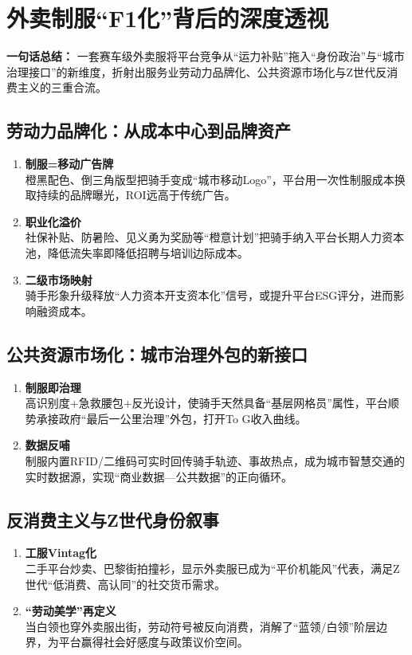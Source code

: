 \section{外卖制服“F1化”背后的深度透视}
\textbf{一句话总结：}  
一套赛车级外卖服将平台竞争从“运力补贴”拖入“身份政治”与“城市治理接口”的新维度，折射出服务业劳动力品牌化、公共资源市场化与Z世代反消费主义的三重合流。

\subsection{劳动力品牌化：从成本中心到品牌资产}
\begin{enumerate}[leftmargin=*, nosep]
    \item \textbf{制服=移动广告牌}  \\
    橙黑配色、倒三角版型把骑手变成“城市移动Logo”，平台用一次性制服成本换取持续的品牌曝光，ROI远高于传统广告。
    \item \textbf{职业化溢价}  \\
    社保补贴、防暑险、见义勇为奖励等“橙意计划”把骑手纳入平台长期人力资本池，降低流失率即降低招聘与培训边际成本。
    \item \textbf{二级市场映射}  \\
    骑手形象升级释放“人力资本开支资本化”信号，或提升平台ESG评分，进而影响融资成本。
\end{enumerate}

\subsection{公共资源市场化：城市治理外包的新接口}
\begin{enumerate}[leftmargin=*, nosep]
    \item \textbf{制服即治理}  \\
    高识别度+急救腰包+反光设计，使骑手天然具备“基层网格员”属性，平台顺势承接政府“最后一公里治理”外包，打开To G收入曲线。
    \item \textbf{数据反哺}  \\
    制服内置RFID/二维码可实时回传骑手轨迹、事故热点，成为城市智慧交通的实时数据源，实现“商业数据—公共数据”的正向循环。
\end{enumerate}

\subsection{反消费主义与Z世代身份叙事}
\begin{enumerate}[leftmargin=*, nosep]
    \item \textbf{工服Vintag化}  \\
    二手平台炒卖、巴黎街拍撞衫，显示外卖服已成为“平价机能风”代表，满足Z世代“低消费、高认同”的社交货币需求。
    \item \textbf{“劳动美学”再定义}  \\
    当白领也穿外卖服出街，劳动符号被反向消费，消解了“蓝领/白领”阶层边界，为平台赢得社会好感度与政策议价空间。
\end{enumerate}

